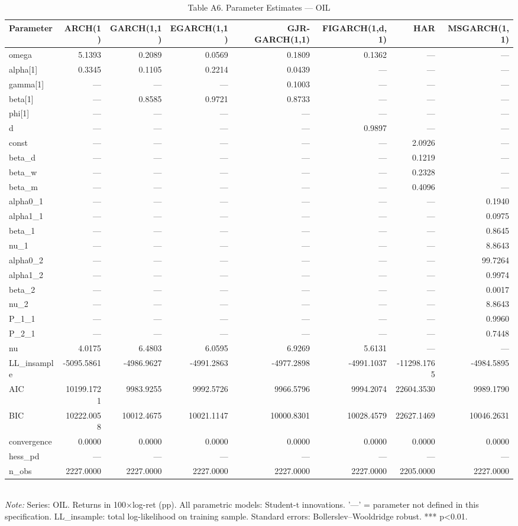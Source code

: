 \begin{table}[ht]
\centering
\caption{Table A6. Parameter Estimates — OIL}
\label{tab:est_oil}
\begin{tabular}{lrrrrrrr}
\toprule
Parameter & ARCH(1) & GARCH(1,1) & EGARCH(1,1) & GJR-GARCH(1,1) & FIGARCH(1,d,1) & HAR & MSGARCH(1,1) \\
\midrule
omega & 5.1393 & 0.2089 & 0.0569 & 0.1809 & 0.1362 & — & — \\
alpha[1] & 0.3345 & 0.1105 & 0.2214 & 0.0439 & — & — & — \\
gamma[1] & — & — & — & 0.1003 & — & — & — \\
beta[1] & — & 0.8585 & 0.9721 & 0.8733 & — & — & — \\
phi[1] & — & — & — & — & — & — & — \\
d & — & — & — & — & 0.9897 & — & — \\
const & — & — & — & — & — & 2.0926 & — \\
beta_d & — & — & — & — & — & 0.1219 & — \\
beta_w & — & — & — & — & — & 0.2328 & — \\
beta_m & — & — & — & — & — & 0.4096 & — \\
alpha0_1 & — & — & — & — & — & — & 0.1940 \\
alpha1_1 & — & — & — & — & — & — & 0.0975 \\
beta_1 & — & — & — & — & — & — & 0.8645 \\
nu_1 & — & — & — & — & — & — & 8.8643 \\
alpha0_2 & — & — & — & — & — & — & 99.7264 \\
alpha1_2 & — & — & — & — & — & — & 0.9974 \\
beta_2 & — & — & — & — & — & — & 0.0017 \\
nu_2 & — & — & — & — & — & — & 8.8643 \\
P_1_1 & — & — & — & — & — & — & 0.9960 \\
P_2_1 & — & — & — & — & — & — & 0.7448 \\
nu & 4.0175 & 6.4803 & 6.0595 & 6.9269 & 5.6131 & — & — \\
LL_insample & -5095.5861 & -4986.9627 & -4991.2863 & -4977.2898 & -4991.1037 & -11298.1765 & -4984.5895 \\
AIC & 10199.1721 & 9983.9255 & 9992.5726 & 9966.5796 & 9994.2074 & 22604.3530 & 9989.1790 \\
BIC & 10222.0058 & 10012.4675 & 10021.1147 & 10000.8301 & 10028.4579 & 22627.1469 & 10046.2631 \\
convergence & 0.0000 & 0.0000 & 0.0000 & 0.0000 & 0.0000 & 0.0000 & 0.0000 \\
hess_pd & — & — & — & — & — & — & — \\
n_obs & 2227.0000 & 2227.0000 & 2227.0000 & 2227.0000 & 2227.0000 & 2205.0000 & 2227.0000 \\
\bottomrule
\end{tabular}
\\[3pt]\footnotesize\textit{Note:} Series: OIL. Returns in 100×log-ret (pp). All parametric models: Student-t innovations. '—' = parameter not defined in this specification. LL_insample: total log-likelihood on training sample. Standard errors: Bollerslev–Wooldridge robust. *** p<0.01.
\end{table}